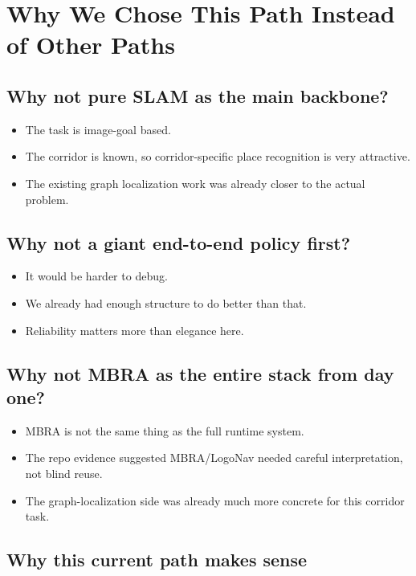 \documentclass[11pt,a4paper]{article}
\begin{document}
\section{Why We Chose This Path Instead of Other Paths}

\subsection{Why not pure SLAM as the main backbone?}

\begin{itemize}[nosep]
  \item The task is image-goal based.
  \item The corridor is known, so corridor-specific place recognition is very
        attractive.
  \item The existing graph localization work was already closer to the actual
        problem.
\end{itemize}

\subsection{Why not a giant end-to-end policy first?}

\begin{itemize}[nosep]
  \item It would be harder to debug.
  \item We already had enough structure to do better than that.
  \item Reliability matters more than elegance here.
\end{itemize}

\subsection{Why not MBRA as the entire stack from day one?}

\begin{itemize}[nosep]
  \item MBRA is not the same thing as the full runtime system.
  \item The repo evidence suggested MBRA/LogoNav needed careful interpretation,
        not blind reuse.
  \item The graph-localization side was already much more concrete for this
        corridor task.
\end{itemize}

\subsection{Why this current path makes sense}
\end{document}
